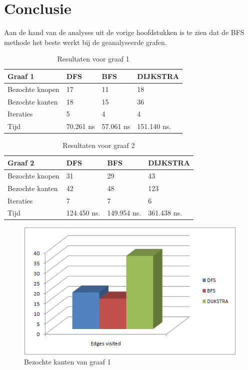 \chapter{Conclusie}
\label{chap:conclusion}

Aan de hand van de analyses uit de vorige hoofdstukken is te zien dat de BFS methode het beste werkt bij de geanalyseerde grafen. 

\begin{table}[h]
 \begin{tabularx}{\linewidth}{| l | X | X | X |}
  \hline
   Graaf 1 & DFS & BFS & DIJKSTRA \\
   \hline
  Bezochte knopen & 17 & 11 & 18 \\
 \hline
  Bezochte kanten & 18 & 15 & 36 \\
\hline
 Iteraties & 5 & 4 & 4 \\
 \hline
 Tijd & 70.261 ns & 57.061 ns & 151.140 ns. \\
 \hline
 \end{tabularx}
 \label{tbl:concl_graaf1}
 \caption{Resultaten voor graaf 1}
\end{table}

\begin{table}[h]
 \begin{tabularx}{\linewidth}{| l | X | X | X |}
  \hline
   Graaf 2 & DFS & BFS & DIJKSTRA \\
   \hline
  Bezochte knopen & 31 & 29 & 43 \\
 \hline
  Bezochte kanten & 42 & 48 & 123 \\
\hline
 Iteraties & 7 & 7 & 6 \\
 \hline
 Tijd & 124.450 ns. & 149.954 ns. & 361.438 ns. \\
 \hline
 \end{tabularx}
 \label{tbl:concl_graaf2}
 \caption{Resultaten voor graaf 2}
\end{table}

\clearpage

\begin{figure}[h]
 \centering
 \includegraphics[width=0.5\linewidth]{conclusion/graph1_edges}
 \caption{Bezochte kanten van graaf 1}
 \label{fig:graph1_edges}
\end{figure}

